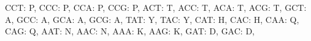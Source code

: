 \documentclass[
  letterpaper,
  DIV=11,
  numbers=noendperiod]{scrreprt}
\newenvironment{Shaded}{\begin{snugshade}}{\end{snugshade}}
\newcommand{\NormalTok}[1]{\textcolor[rgb]{0.00,0.23,0.31}{#1}}
\newcommand{\StringTok}[1]{\textcolor[rgb]{0.13,0.47,0.30}{#1}}
\theoremstyle{definition}
\theoremstyle{remark}
\begin{document}
\begin{tcolorbox}
\begin{Shaded}
\begin{Highlighting}[]
    \StringTok{\textquotesingle{}CCT\textquotesingle{}}\NormalTok{: }\StringTok{\textquotesingle{}P\textquotesingle{}}\NormalTok{, }\StringTok{\textquotesingle{}CCC\textquotesingle{}}\NormalTok{: }\StringTok{\textquotesingle{}P\textquotesingle{}}\NormalTok{, }\StringTok{\textquotesingle{}CCA\textquotesingle{}}\NormalTok{: }\StringTok{\textquotesingle{}P\textquotesingle{}}\NormalTok{, }\StringTok{\textquotesingle{}CCG\textquotesingle{}}\NormalTok{: }\StringTok{\textquotesingle{}P\textquotesingle{}}\NormalTok{,}
    \StringTok{\textquotesingle{}ACT\textquotesingle{}}\NormalTok{: }\StringTok{\textquotesingle{}T\textquotesingle{}}\NormalTok{, }\StringTok{\textquotesingle{}ACC\textquotesingle{}}\NormalTok{: }\StringTok{\textquotesingle{}T\textquotesingle{}}\NormalTok{, }\StringTok{\textquotesingle{}ACA\textquotesingle{}}\NormalTok{: }\StringTok{\textquotesingle{}T\textquotesingle{}}\NormalTok{, }\StringTok{\textquotesingle{}ACG\textquotesingle{}}\NormalTok{: }\StringTok{\textquotesingle{}T\textquotesingle{}}\NormalTok{,}
    \StringTok{\textquotesingle{}GCT\textquotesingle{}}\NormalTok{: }\StringTok{\textquotesingle{}A\textquotesingle{}}\NormalTok{, }\StringTok{\textquotesingle{}GCC\textquotesingle{}}\NormalTok{: }\StringTok{\textquotesingle{}A\textquotesingle{}}\NormalTok{, }\StringTok{\textquotesingle{}GCA\textquotesingle{}}\NormalTok{: }\StringTok{\textquotesingle{}A\textquotesingle{}}\NormalTok{, }\StringTok{\textquotesingle{}GCG\textquotesingle{}}\NormalTok{: }\StringTok{\textquotesingle{}A\textquotesingle{}}\NormalTok{,}
    \StringTok{\textquotesingle{}TAT\textquotesingle{}}\NormalTok{: }\StringTok{\textquotesingle{}Y\textquotesingle{}}\NormalTok{, }\StringTok{\textquotesingle{}TAC\textquotesingle{}}\NormalTok{: }\StringTok{\textquotesingle{}Y\textquotesingle{}}\NormalTok{, }\StringTok{\textquotesingle{}CAT\textquotesingle{}}\NormalTok{: }\StringTok{\textquotesingle{}H\textquotesingle{}}\NormalTok{, }\StringTok{\textquotesingle{}CAC\textquotesingle{}}\NormalTok{: }\StringTok{\textquotesingle{}H\textquotesingle{}}\NormalTok{,}
    \StringTok{\textquotesingle{}CAA\textquotesingle{}}\NormalTok{: }\StringTok{\textquotesingle{}Q\textquotesingle{}}\NormalTok{, }\StringTok{\textquotesingle{}CAG\textquotesingle{}}\NormalTok{: }\StringTok{\textquotesingle{}Q\textquotesingle{}}\NormalTok{, }\StringTok{\textquotesingle{}AAT\textquotesingle{}}\NormalTok{: }\StringTok{\textquotesingle{}N\textquotesingle{}}\NormalTok{, }\StringTok{\textquotesingle{}AAC\textquotesingle{}}\NormalTok{: }\StringTok{\textquotesingle{}N\textquotesingle{}}\NormalTok{,}
    \StringTok{\textquotesingle{}AAA\textquotesingle{}}\NormalTok{: }\StringTok{\textquotesingle{}K\textquotesingle{}}\NormalTok{, }\StringTok{\textquotesingle{}AAG\textquotesingle{}}\NormalTok{: }\StringTok{\textquotesingle{}K\textquotesingle{}}\NormalTok{, }\StringTok{\textquotesingle{}GAT\textquotesingle{}}\NormalTok{: }\StringTok{\textquotesingle{}D\textquotesingle{}}\NormalTok{, }\StringTok{\textquotesingle{}GAC\textquotesingle{}}\NormalTok{: }\StringTok{\textquotesingle{}D\textquotesingle{}}\NormalTok{,}

\end{Highlighting}
\end{Shaded}
\end{tcolorbox}
\end{document}
